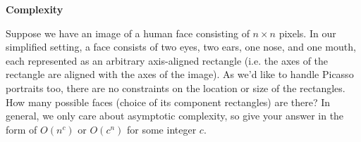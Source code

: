\item {} {\bf Complexity}

Suppose we have an image of a human face consisting of $n \times n$ pixels. In
our simplified setting, a face consists of two eyes, two ears, one nose, and one
mouth, each represented as an arbitrary axis-aligned rectangle (i.e. the axes of
the rectangle are aligned with the axes of the image).  As we'd like to handle
Picasso portraits too, there are no constraints on the location or size of the
rectangles. How many possible faces (choice of its component rectangles) are
there? In general, we only care about asymptotic complexity, so give your answer
in the form of $O(n^c)$ or $O(c^n)$ for some integer $c$.
